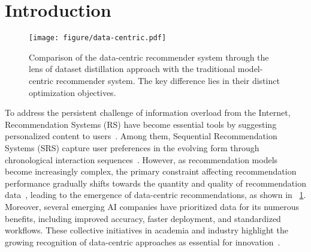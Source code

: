 \section{Introduction} \label{sec:intro}

\vspace{0.2mm}

\begin{figure}[t!] \centering
    \centering
    \texttt{[image: figure/data-centric.pdf]}
    \vspace{-0.5cm}
    \caption{Comparison of the data-centric recommender system through the lens of dataset distillation approach with the traditional model-centric recommender system. The key difference lies in their distinct optimization objectives.}
    \label{fig:data-centric}
    \vspace{-0.4cm}
\end{figure}

To address the persistent challenge of information overload from the Internet, Recommendation Systems (RS) have become essential tools by suggesting personalized content to users~\cite{xu2024multi,wu2023survey,han2023guesr,wang2021hypersorec,zhang2024unified,yin2023apgl4sr}. Among them, Sequential Recommendation Systems (SRS) capture user preferences in the evolving form through chronological interaction sequences~\cite{zheng2024enhanced, end4rec, sequential_recommendation_survey1, SASRec, xie2024breaking, shen2024predictive}. However, as recommendation models become increasingly complex, the primary constraint affecting recommendation performance gradually shifts towards the quantity and quality of recommendation data~\cite{lai2024survey}, leading to the emergence of data-centric recommendations, as shown in ~\cref{fig:data-centric}.
Moreover, several emerging AI companies have prioritized data for its numerous benefits, including improved accuracy, faster deployment, and standardized workflows. These collective initiatives in academia and industry highlight the growing recognition of data-centric approaches as essential for innovation~\cite{landingai, scaleai, snorkelai, li2024configure}.


